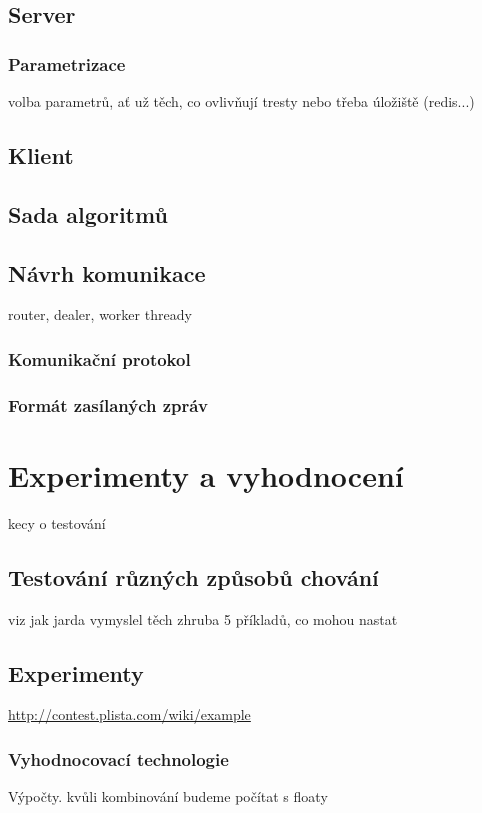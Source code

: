 \documentclass[thesis=M,czech]{FITthesis}[2014/05/07]
\begin{document}
\section{Server}

\subsection{Parametrizace}
volba parametrů, ať už těch, co ovlivňují tresty nebo třeba úložiště (redis...)

\section{Klient}

\section{Sada algoritmů}
\label{sec:alg}

\section{Návrh komunikace}
router, dealer, worker thready

\subsection{Komunikační protokol}

\subsection{Formát zasílaných zpráv}

\chapter{Experimenty a vyhodnocení}
\label{chap:tests}
kecy o testování
\section{Testování různých způsobů chování}
viz jak jarda vymyslel těch zhruba 5 příkladů, co mohou nastat
\section{Experimenty}

\url{http://contest.plista.com/wiki/example}
	\subsection{Vyhodnocovací technologie}	
	Výpočty. kvůli kombinování budeme počítat s floaty
	
\end{document}
